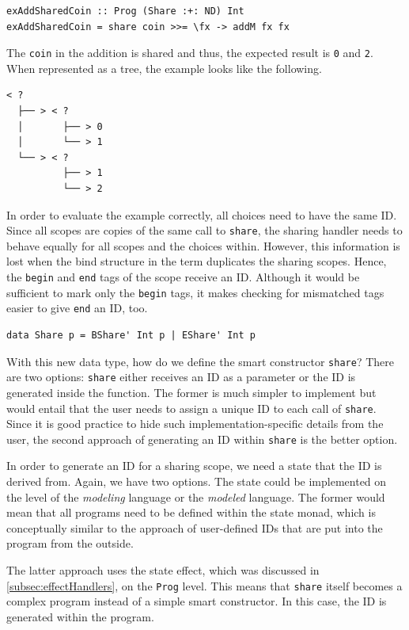 \documentclass[a4paper, 11pt, fleqn, twoside, abstract=on]{scrreprt}
\newcommand{\hinl}[1]{\texttt{#1}}
\begin{document}
\begin{verbatim}
exAddSharedCoin :: Prog (Share :+: ND) Int
exAddSharedCoin = share coin >>= \fx -> addM fx fx
\end{verbatim}
\noindent
The \hinl{coin} in the addition is shared and thus, the expected result is \hinl{0} and \hinl{2}.
When represented as a tree, the example looks like the following.

\begin{verbatim}
< ? 
  ├── > < ? 
  │       ├── > 0
  │       └── > 1
  └── > < ? 
          ├── > 1
          └── > 2
\end{verbatim}

In order to evaluate the example correctly, all choices need to have the same ID.
Since all scopes are copies of the same call to \hinl{share}, the sharing handler needs to behave equally for all scopes and the choices within.
However, this information is lost when the bind structure in the term duplicates the sharing scopes.
Hence, the \hinl{begin} and \hinl{end} tags of the scope receive an ID.
Although it would be sufficient to mark only the \hinl{begin} tags, it makes checking for mismatched tags easier to give \hinl{end} an ID, too.

\begin{verbatim}
data Share p = BShare' Int p | EShare' Int p
\end{verbatim}

With this new data type, how do we define the smart constructor \hinl{share}?
There are two options: \hinl{share} either receives an ID as a parameter or the ID is generated inside the function.
The former is much simpler to implement but would entail that the user needs to assign a unique ID to each call of \hinl{share}.
Since it is good practice to hide such implementation-specific details from the user, the second approach of generating an ID within \hinl{share} is the better option.

In order to generate an ID for a sharing scope, we need a state that the ID is derived from.
Again, we have two options.
The state could be implemented on the level of the \textit{modeling} language or the \textit{modeled} language.
The former would mean that all programs need to be defined within the state monad, which is conceptually similar to the approach of user-defined IDs that are put into the program from the outside.

The latter approach uses the state effect, which was discussed in \autoref{subsec:effectHandlers},  on the \hinl{Prog} level.
This means that \hinl{share} itself becomes a complex program instead of a simple smart constructor.
In this case, the ID is generated within the program.
\end{document}
